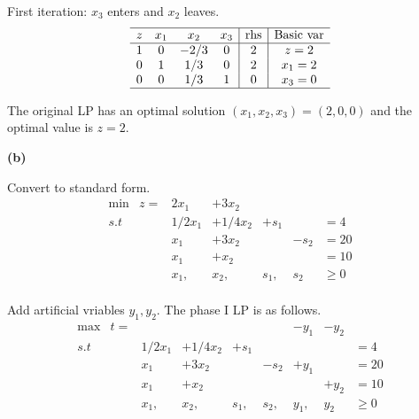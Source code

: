 \documentclass[12pt]{article}
\begin{document}
First iteration: $ x_3 $ enters and $ x_2 $ leaves.
\begin{equation*}
  \begin{array}{cccc|c|c}
    \hline
    z &  x_1      &  x_2   &  x_3       &   \text{rhs} & \text{Basic var}  \\ \hline
    1 &    0      &  -2/3  &    0       & 2            &  z=2              \\
    0 &    1      &  1/3   &    0       & 2            &  x_1 = 2          \\
    0 &    0      &  1/3   &    1       & 0            &  x_3 = 0          \\ \hline
  \end{array}
\end{equation*}

The original LP has an optimal solution $(x_1,x_2,x_3) = (2,0,0)$ and the optimal value is $z=2$.

\noindent
\textbf{(b)}

Convert to standard form.
\begin{equation*}
  \begin{array}{ccccccc}
    \text{min}& z= &    2x_1      &+3x_2   & &   &        \\ 
    s.t       &    &    1/2x_1      &   + 1/4x_2 &    +s_1 &                 &  =4              \\
              &    &    x_1      &    +3x_2 &     &   -s_2  &             = 20          \\
              &    &    x_1      &    + x_2 &     &             &             = 10          \\
              &    &    x_1,      &    x_2, &    s_1, &    s_2  &              \ge 0\\ 
  \end{array}
\end{equation*}

Add artificial vriables $y_1, y_2$. The phase I LP is as follows.
\begin{equation*}
  \begin{array}{ccccccccc}
    \text{max}& t= &          &   & &   & -y_1 & -y_2 &        \\ 
    s.t       &    &    1/2x_1      &   + 1/4x_2 &    +s_1 &           &&      &  =4              \\
              &    &    x_1      &    +3x_2 &     &   -s_2  &  +y_1&&           = 20          \\
              &    &    x_1      &    + x_2 &     &             &  &+y_2&           = 10          \\
              &    &    x_1,      &    x_2, &    s_1, &    s_2,  &  y_1,   & y_2 &         \ge 0\\ 
  \end{array}
\end{equation*}
\end{document}
